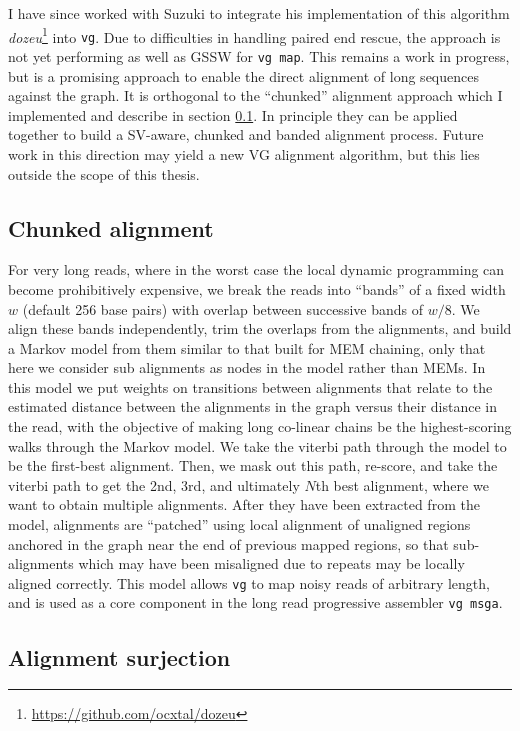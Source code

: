 I have since worked with Suzuki to integrate his implementation of this algorithm \emph{dozeu}\footnote{\url{https://github.com/ocxtal/dozeu}} into {\tt vg}.
Due to difficulties in handling paired end rescue, the approach is not yet performing as well as GSSW for {\tt vg map}.
This remains a work in progress, but is a promising approach to enable the direct alignment of long sequences against the graph.
It is orthogonal to the ``chunked'' alignment approach which I implemented and describe in section \ref{sec:chunked_alignment}.
In principle they can be applied together to build a SV-aware, chunked and banded alignment process.
Future work in this direction may yield a new VG alignment algorithm, but this lies outside the scope of this thesis.

\subsection{Chunked alignment}
\label{sec:chunked_alignment}

For very long reads, where in the worst case the local dynamic programming can become prohibitively expensive, we break the reads into ``bands'' of a fixed width $w$ (default 256 base pairs) with overlap between successive bands of $w/8$.
We align these bands independently, trim the overlaps from the alignments, and build a Markov model from them similar to that built for MEM chaining, 
only that here we consider sub alignments as nodes in the model rather than MEMs. 
In this model we put weights on transitions between alignments that relate to the estimated distance between the alignments in the graph versus their distance in the read, with the objective of making long co-linear chains be the highest-scoring walks through the Markov model.
We take the viterbi path through the model to be the first-best alignment.
Then, we mask out this path, re-score, and take the viterbi path to get the 2nd, 3rd, and ultimately $N$th best alignment, where we want to obtain multiple alignments. 
After they have been extracted from the model, alignments are ``patched'' using local alignment of unaligned regions anchored in the graph near the end of previous mapped regions, so that sub-alignments which may have been misaligned due to repeats may be locally aligned correctly.
This model allows {\tt vg} to map noisy reads of arbitrary length, and is used as a core component in the long read progressive assembler {\tt vg msga}.


\subsection{Alignment surjection}


